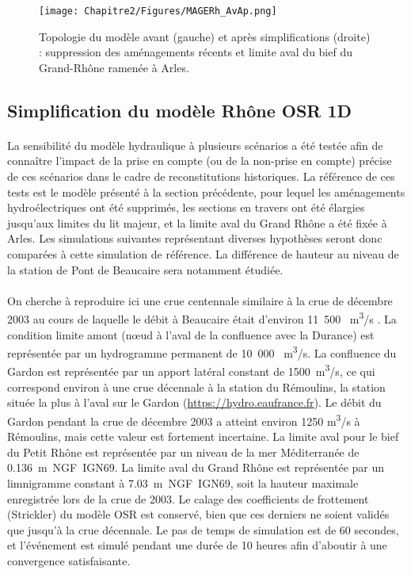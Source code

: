 	\begin{figure}[h]
	\centering
		\texttt{[image: Chapitre2/Figures/MAGERh\_AvAp.png]}
        \caption{Topologie du modèle avant (gauche) et après simplifications (droite) : suppression des aménagements récents et limite aval du bief du Grand-Rhône ramenée à Arles.}
		\label{fig:Mageavap}
	\end{figure}		
	
\FloatBarrier	
	\subsection{Simplification du modèle Rhône OSR 1D}
		
	\paragraph{} La sensibilité du modèle hydraulique à plusieurs scénarios a été testée afin de connaître l'impact de la prise en compte (ou de la non-prise en compte) précise de ces scénarios dans le cadre de reconstitutions historiques. La référence de ces tests est le modèle présenté à la section précédente, pour lequel les aménagements hydroélectriques ont été supprimés, les sections en travers ont été élargies jusqu'aux limites du lit majeur, et la limite aval du Grand Rhône a été fixée à Arles. Les simulations suivantes représentant diverses hypothèses seront donc comparées à cette simulation de référence. La différence de hauteur au niveau de la station de Pont de Beaucaire sera notamment étudiée.
	
	\paragraph{} On cherche à reproduire ici une crue centennale similaire à la crue de décembre 2003 au cours de laquelle le débit à Beaucaire était d'environ 11~500~ m\textsuperscript{3}/s \citep{medd_debit_2005}. La condition limite amont (nœud à l'aval de la confluence avec la Durance) est représentée par un hydrogramme permanent de 10~000~ m\textsuperscript{3}/s. La confluence du Gardon est représentée par un apport latéral constant de 1500~m\textsuperscript{3}/s, ce qui correspond environ à une crue décennale à la station du Rémoulins, la station située la plus à l'aval sur le Gardon (\url{https://hydro.eaufrance.fr}). Le débit du Gardon pendant la crue de décembre 2003 a atteint environ 1250 m\textsuperscript{3}/s à Rémoulins, mais cette valeur est fortement incertaine. La limite aval pour le bief du Petit Rhône est représentée par un niveau de la mer Méditerranée de 0.136~m~NGF~IGN69. La limite aval du Grand Rhône est représentée par un limnigramme constant à 7.03~m~NGF~IGN69, soit la hauteur maximale enregistrée lors de la crue de 2003. Le calage des coefficients de frottement (Strickler) du modèle OSR \citep{launay_zabr-osr_2017} est conservé, bien que ces derniers ne soient validés que jusqu'à la crue décennale. Le pas de temps de simulation est de 60 secondes, et l'événement est simulé pendant une durée de 10 heures afin d'aboutir à une convergence satisfaisante.

